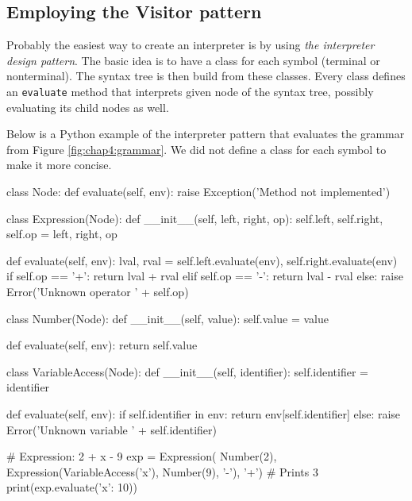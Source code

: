 \subsection{Employing the Visitor pattern}
Probably the easiest way to create an interpreter is by using \emph{the interpreter design pattern}. The basic idea is to have a class for each symbol
(terminal or nonterminal). The syntax tree is then build from these classes. Every class defines an \texttt{evaluate} method that interprets given node
of the syntax tree, possibly evaluating its child nodes as well.

Below is a Python example of the interpreter pattern that evaluates the grammar from Figure \ref{fig:chap4:grammar}. We did not define a class for each
symbol to make it more concise.
\begin{code}
class Node:
    def evaluate(self, env):
        raise Exception('Method not implemented')

class Expression(Node):
    def __init__(self, left, right, op):
        self.left, self.right, self.op = left, right, op

    def evaluate(self, env):
        lval, rval = self.left.evaluate(env), self.right.evaluate(env)
        if self.op == '+':
            return lval + rval
        elif self.op == '-':
            return lval - rval
        else:
            raise Error('Unknown operator ' + self.op)

class Number(Node):
    def __init__(self, value):
        self.value = value
    
    def evaluate(self, env):
        return self.value

class VariableAccess(Node):
    def __init__(self, identifier):
        self.identifier = identifier
    
    def evaluate(self, env):
        if self.identifier in env:
            return env[self.identifier]
        else:
            raise Error('Unknown variable ' + self.identifier)

# Expression: 2 + x - 9
exp = Expression(
    Number(2),
    Expression(VariableAccess('x'), Number(9), '-'),
    '+')
# Prints 3
print(exp.evaluate({'x': 10}))
\end{code}

